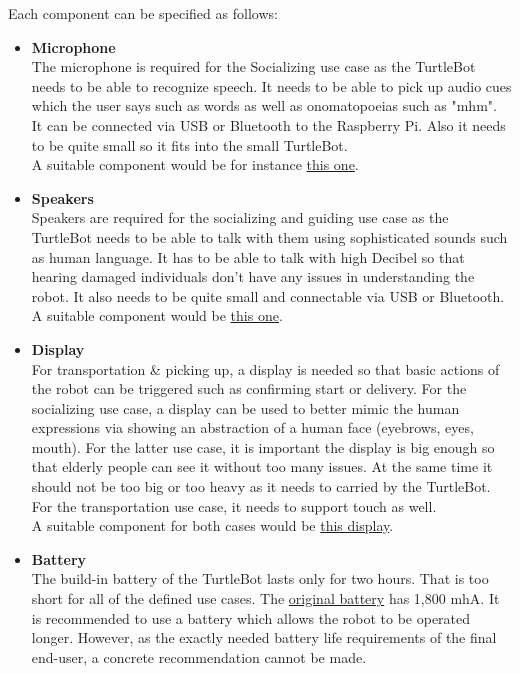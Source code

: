 \documentclass[plainarticle,zihtitle,english,final,hyperref,utf8]{zihpub}
\begin{document}
Each component can be specified as follows:
\begin{itemize}
    \item \textbf{Microphone}\\
    The microphone is required for the Socializing use case as the TurtleBot needs to be able to recognize speech. It needs to be able to pick up audio cues which the user says such as words as well as onomatopoeias such as "mhm". It can be connected via USB or Bluetooth to the Raspberry Pi. Also it needs to be quite small so it fits into the small TurtleBot.\\
    A suitable component would be for instance \href{https://www.conrad.de/de/p/seeed-studio-101020023-sound-sensor-1369545.html}{this one}.
    \item \textbf{Speakers}\\
    Speakers are required for the socializing and guiding use case as the TurtleBot needs to be able to talk with them using sophisticated sounds such as human language. It has to be able to talk with high Decibel so that hearing damaged individuals don't have any issues in understanding the robot. It also needs to be quite small and connectable via USB or Bluetooth.\\
    A suitable component would be \href{https://www.rasppishop.de/Lautsprecher-USB-Stromversorung-Raspberry}{this one}.
    \item \textbf{Display}\\
    For transportation \& picking up, a display is needed so that basic actions of the robot can be triggered such as confirming start or delivery. For the socializing use case, a display can be used to better mimic the human expressions via showing an abstraction of a human face (eyebrows, eyes, mouth). For the latter use case, it is important the display is big enough so that elderly people can see it without too many issues. At the same time it should not be too big or too heavy as it needs to carried by the TurtleBot. For the transportation use case, it needs to support touch as well.\\
    A suitable component for both cases would be \href{https://www.amazon.de/Raspberry-Bildschirm-kapazitiver-Touchscreen-Monitor/dp/B07YCBWRQP/}{this display}.
    \item \textbf{Battery}\\
    The build-in battery of the TurtleBot lasts only for two hours. That is too short for all of the defined use cases. The \href{https://www.mybotshop.de/ROBOTIS-OP-TB3-LIPO-Battery-111V-1800mAh-LB-012}{original battery} has 1,800 mhA. It is recommended to use a battery which allows the robot to be operated longer. However, as the exactly needed battery life requirements of the final end-user, a concrete recommendation cannot be made.\\

\end{itemize}
\end{document}
